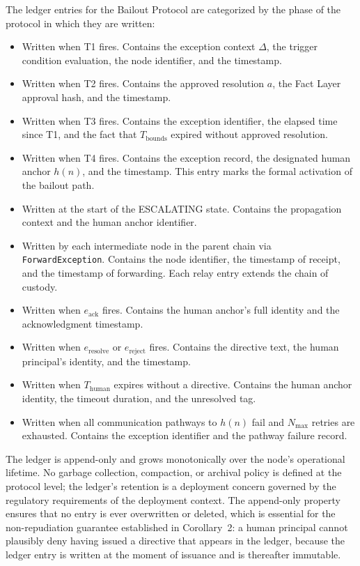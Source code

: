 The ledger entries for the Bailout Protocol are categorized by the phase of the protocol in which they are written:

\begin{itemize}\itemsep=0pt
  \item[\texttt{BOUNDED\_ENTERED}:] Written when T1 fires. Contains the exception context $\Delta$, the trigger condition evaluation, the node identifier, and the timestamp.
  \item[\texttt{BOUNDED\_EXIT\_RESOLVED}:] Written when T2 fires. Contains the approved resolution $a$, the Fact Layer approval hash, and the timestamp.
  \item[\texttt{BOUNDED\_EXIT\_TIMEOUT}:] Written when T3 fires. Contains the exception identifier, the elapsed time since T1, and the fact that $T_{\text{bounds}}$ expired without approved resolution.
  \item[\texttt{BAILOUT\_ACTIVATED}:] Written when T4 fires. Contains the exception record, the designated human anchor $h(n)$, and the timestamp. This entry marks the formal activation of the bailout path.
  \item[\texttt{BAILOUT\_ESCALATING}:] Written at the start of the ESCALATING state. Contains the propagation context and the human anchor identifier.
  \item[\texttt{BAILOUT\_RELAY}:] Written by each intermediate node in the parent chain via \texttt{ForwardException}. Contains the node identifier, the timestamp of receipt, and the timestamp of forwarding. Each relay entry extends the chain of custody.
  \item[\texttt{HUMAN\_ACKNOWLEDGED}:] Written when $e_{\text{ack}}$ fires. Contains the human anchor's full identity and the acknowledgment timestamp.
  \item[\texttt{DIRECTIVE\_ISSUED}:] Written when $e_{\text{resolve}}$ or $e_{\text{reject}}$ fires. Contains the directive text, the human principal's identity, and the timestamp.
  \item[\texttt{TIMEOUT\_UNRESOLVED}:] Written when $T_{\text{human}}$ expires without a directive. Contains the human anchor identity, the timeout duration, and the unresolved tag.
  \item[\texttt{PATHWAY\_EXHAUSTED}:] Written when all communication pathways to $h(n)$ fail and $N_{\max}$ retries are exhausted. Contains the exception identifier and the pathway failure record.
\end{itemize}

The ledger is append-only and grows monotonically over the node's operational lifetime. No garbage collection, compaction, or archival policy is defined at the protocol level; the ledger's retention is a deployment concern governed by the regulatory requirements of the deployment context. The append-only property ensures that no entry is ever overwritten or deleted, which is essential for the non-repudiation guarantee established in Corollary~2: a human principal cannot plausibly deny having issued a directive that appears in the ledger, because the ledger entry is written at the moment of issuance and is thereafter immutable.

